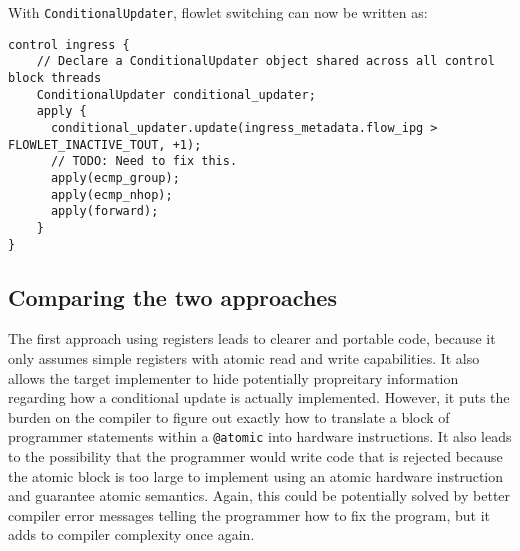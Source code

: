 With \texttt{ConditionalUpdater}, flowlet switching can now be written as:

\begin{verbatim}
control ingress {
    // Declare a ConditionalUpdater object shared across all control block threads
    ConditionalUpdater conditional_updater;
    apply {
      conditional_updater.update(ingress_metadata.flow_ipg > FLOWLET_INACTIVE_TOUT, +1);
      // TODO: Need to fix this.
      apply(ecmp_group);
      apply(ecmp_nhop);
      apply(forward);
    }
}
\end{verbatim}

\subsection{Comparing the two approaches}
The first approach using registers leads to clearer and portable code, because
it only assumes simple registers with atomic read and write capabilities. It
also allows the target implementer to hide potentially propreitary information
regarding how a conditional update is actually implemented. However, it puts
the burden on the compiler to figure out exactly how to translate a block of
programmer statements within a \texttt{@atomic} into hardware instructions. It
also leads to the possibility that the programmer would write code that is
rejected because the atomic block is too large to implement using an atomic
hardware instruction and guarantee atomic semantics. Again, this could be
potentially solved by better compiler error messages telling the programmer how
to fix the program, but it adds to compiler complexity once again.

